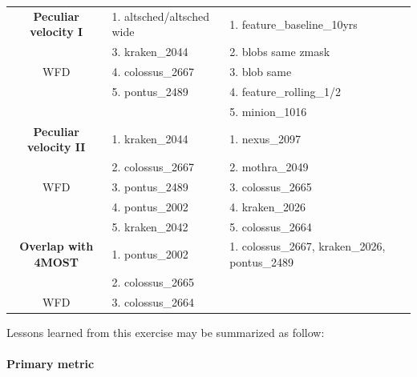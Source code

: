 \documentclass[a4paper,10pt]{article}
\begin{document}
\begin{table}[!htbp]
\begin{center}
\begin{tabular}{c|l|l}
{\bf Peculiar velocity I}      & 1. altsched/altsched wide                &  1. feature\_baseline\_10yrs \\
                               & 3. kraken\_2044                          &  2. blobs same zmask\\
      WFD                      & 4. colossus\_2667                        & 3. blob same \\
                               & 5. pontus\_2489                          & 4. feature\_rolling\_1/2\\
                               &                                          &  5.  minion\_1016\\
      \hline
{\bf Peculiar velocity II}     & 1. kraken\_2044                          &  1. nexus\_2097\\
                               & 2. colossus\_2667                        &  2. mothra\_2049 \\
      WFD                      & 3. pontus\_2489                          &  3. colossus\_2665 \\
                               & 4. pontus\_2002                          &  4. kraken\_2026 \\
                               & 5. kraken\_2042                           &  5. colossus\_2664 \\
      \hline

 {\bf Overlap with 4MOST}      & 1. pontus\_2002                          &  1. colossus\_2667, kraken\_2026, pontus\_2489\\
                               & 2. colossus\_2665                        &  \\
   WFD                         & 3. colossus\_2664                        &   \\
     \hline
\end{tabular}
\end{center}
\end{table}

\noindent Lessons learned from this exercise may be summarized as follow:

\paragraph{Primary metric} 
\end{document}
